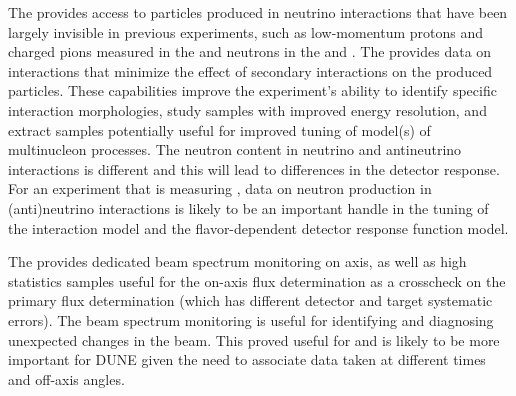 The    provides access to particles produced in neutrino interactions that have been largely invisible in previous experiments, such as low-momentum protons and charged pions measured in the  and neutrons in the  and . The  provides data on interactions that minimize the effect of secondary interactions on the produced particles.  These capabilities improve the experiment's ability to identify specific interaction morphologies, study samples with improved energy resolution, and extract samples potentially useful for improved tuning of model(s) of multinucleon processes. The neutron content in neutrino and antineutrino interactions is different and this will lead to differences in the detector response. For an experiment that is measuring , data on neutron production in (anti)neutrino interactions is likely to be an important handle in the tuning of the interaction model and the flavor-dependent detector response function model.

The  provides dedicated beam spectrum monitoring on axis, as well as high statistics samples  useful for the on-axis flux determination as a crosscheck on the primary flux determination (which has different detector and target systematic errors). The beam spectrum monitoring is useful for identifying and diagnosing unexpected changes in the beam.  This proved useful for  and is likely to be more important for DUNE given the need to associate data taken at different times and off-axis angles. 


